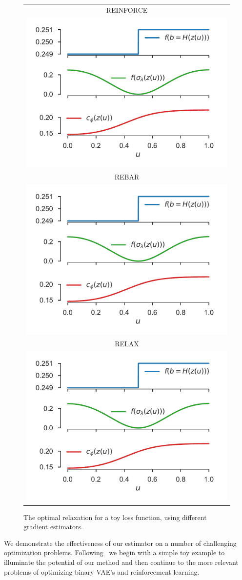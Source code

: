\documentclass{article}
\newcommand{\E}{\mathbb{E}}
\begin{document}
\begin{figure}
\centering
\vspace{-10mm}
\begin{tabular}{c}
REINFORCE\\
\hspace{-3mm}\includegraphics[width=0.50\columnwidth, clip, trim=0.5cm 8cm 0.8cm 0cm]{figures/relaxations_t_499_which_2}\\
REBAR\\
\hspace{-3mm}\includegraphics[width=0.50\columnwidth, clip, trim=0.5cm 5cm 0.8cm 4cm]{figures/relaxations_t_499_which_2}\\
RELAX\\
\hspace{-3mm}\includegraphics[width=0.50\columnwidth, clip, trim=0.5cm 0cm 0.8cm 7cm]{figures/relaxations_t_499_which_2}
\end{tabular}
\vspace*{-6mm}
\caption{The optimal relaxation for a toy loss function, using different gradient estimators.}
\label{learned-relaxations}
\end{figure}
%
We demonstrate the effectiveness of our estimator on a number of challenging optimization problems. Following~\citet{tucker2017rebar} we begin with a simple toy example to illuminate the potential of our method and then continue to the more relevant problems of optimizing binary VAE's and reinforcement learning.
\end{document}
